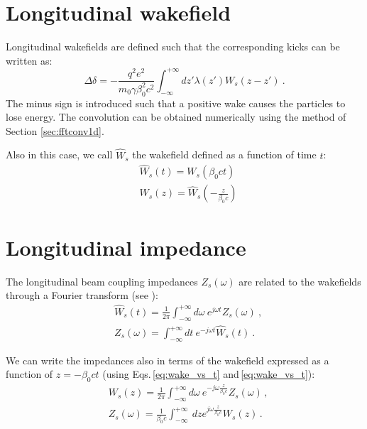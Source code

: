 \section{Longitudinal wakefield}

Longitudinal wakefields are defined such that the corresponding kicks can be written as:
\begin{equation}
    \Delta \delta = -\frac{q^2 e^2}{m_0 \gamma \beta_0^2 c^2} \int_{-\infty}^{+\infty} dz' \lambda(z') W_s(z-z') ~ .
\end{equation}
The minus sign is introduced such that a positive wake causes the particles to lose energy. The convolution can be obtained numerically using the method of Section \ref{sec:fftconv1d}.

Also in this case, we call $\widehat{W}_{s}$ the wakefield defined as a function of time $t$:
\begin{align}
    &\widehat{W}_{s}(t) = {W}_{s}\left(\beta_0 c t\right) \label{eq:wake_vs_t}\\
    &W_s(z) = \widehat{W}_{s}\left(-\frac{z}{\beta_0 c}\right) \label{eq:wake_vs_z}
\end{align}

\section{Longitudinal impedance}

The longitudinal beam coupling impedances $Z_{s}(\omega)$ are related to the wakefields through a Fourier transform (see \cite[Eq. 1.216]{Mounet:Thesis}):
\begin{align}
    &\widehat{W}_s(t) = \frac{1}{2\pi}\int_{-\infty}^{+\infty} d\omega \ e^{j\omega t} Z_{s}(\omega)~,\label{eq:wake_from_imp_long}\\
    &Z_s(\omega) = \int_{-\infty}^{+\infty} dt \ e^{-j\omega t} \widehat{W}_{s}(t)~.\label{eq:imp_from_wake_long}
\end{align}

We can write the impedances also in terms of the wakefield expressed as a function of $z= -\beta_0 c t$ (using Eqs.\,\ref{eq:wake_vs_t} and\,\ref{eq:wake_vs_t}):
\begin{align}
    &W_{s}(z) = \frac{1}{2\pi}\int_{-\infty}^{+\infty} d\omega \ e^{-j\omega \frac{z}{\beta_0 c}} Z_{s}(\omega)\, ,\\
    &Z_{s}(\omega) = \frac{1}{\beta_0 c} \int_{-\infty}^{+\infty} \ dz e^{j \omega \frac{z}{\beta_0 c}} W_{s}(z)\, .
\end{align}

